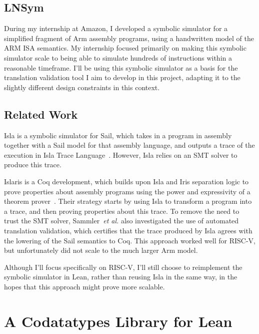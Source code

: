 \documentclass[a4paper]{scrartcl}
\newcommand*{\etal}{~\emph{et al.}}
\begin{document}
\subsection{LNSym}\label{lnsym}

During my internship at Amazon, I developed a symbolic simulator for a
simplified fragment of Arm assembly programs, using a handwritten model
of the ARM ISA semantics. My internship focused primarily on making this
symbolic simulator scale to being able to simulate hundreds of
instructions within a reasonable timeframe. I'll be using this symbolic
simulator as a basis for the translation validation tool I aim to
develop in this project, adapting it to the slightly different design constraints in
this context. 

\subsection{Related Work}\label{related-work}

Isla is a symbolic simulator for Sail, which takes in a program in assembly 
together with a Sail model for that assembly language, and outputs a trace of the
execution in Isla Trace Language~\cite{armstrongIslaIntegratingFullScale2021}.
However, Isla relies on an SMT solver to produce this trace.

Islaris is a Coq development, which builds upon Isla and Iris separation logic to 
prove properties about assembly programs using the power and expressivity of a 
theorem prover~\cite{sammlerIslarisVerificationMachine2022}. Their strategy starts by using Isla to transform a program into a trace, and then proving properties about this trace.
To remove the need to trust the SMT solver, Sammler\etal{} also investigated
the use of automated translation validation, which certifies that the trace produced
by Isla agrees with the lowering of the Sail semantics to Coq. This approach 
worked well for RISC-V, but unfortunately did not scale to the much larger Arm model.

Although I'll focus specifically on RISC-V, I'll still choose to reimplement 
the symbolic simulator in Lean, rather than reusing Isla in the same way, 
in the hopes that this approach might prove more scalable.


\section{A Codatatypes Library for
Lean}\label{a-codatatypes-library-for-lean}
\end{document}

